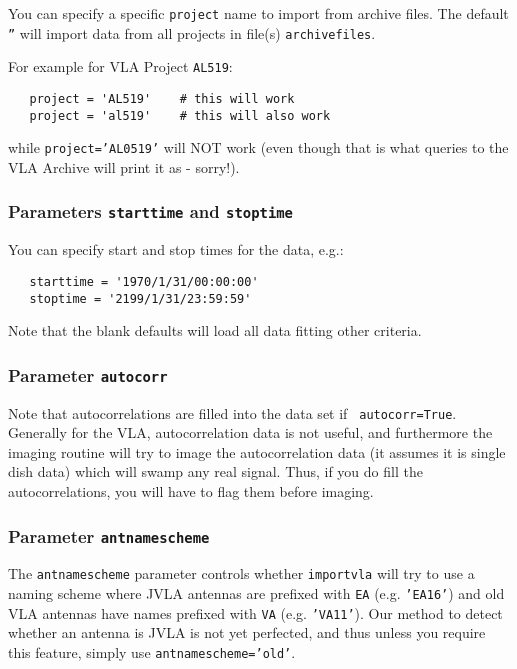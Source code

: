 You can specify a specific {\tt project} name to import from 
archive files.  The default {\tt ''} will import data from all
projects in file(s) {\tt archivefiles}.

For example for VLA Project {\tt AL519}:
\small
\begin{verbatim}
   project = 'AL519'    # this will work
   project = 'al519'    # this will also work
\end{verbatim}
\normalsize
while {\tt project='AL0519'} will NOT work (even though that is what
queries to the VLA Archive will print it as - sorry!).

\subsubsection{Parameters {\tt starttime} and {\tt stoptime} }
\label{section:io.import.vla.starttime}

You can specify start and stop times for the data, e.g.:
\small
\begin{verbatim}
   starttime = '1970/1/31/00:00:00'
   stoptime = '2199/1/31/23:59:59'
\end{verbatim}
\normalsize
Note that the blank defaults will load all data fitting other criteria.

\subsubsection{Parameter {\tt autocorr} }
\label{section:io.import.vla.autocorr}

Note that autocorrelations are filled into the data set if {\tt
autocorr=True}.  Generally for the VLA, autocorrelation data is not
useful, and furthermore the imaging routine will try to image the
autocorrelation data (it assumes it is single dish data) which will
swamp any real signal.  Thus, if you do fill the autocorrelations, you
will have to flag them before imaging.

\subsubsection{Parameter {\tt antnamescheme} }
\label{section:io.import.vla.antnamescheme}

The {\tt antnamescheme} parameter controls whether {\tt importvla}
will try to use a naming scheme where JVLA antennas are prefixed
with {\tt EA} (e.g. {\tt 'EA16'}) and old VLA antennas have names
prefixed with {\tt VA} (e.g. {\tt 'VA11'}).  Our method to detect
whether an antenna is JVLA is not yet perfected, and thus unless you
require this feature, simply use {\tt antnamescheme='old'}.


